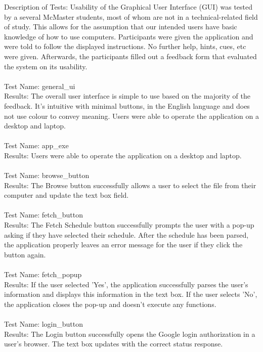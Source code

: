 \documentclass[12pt, titlepage]{article}
\begin{document}
	Description of Tests: Usability of the Graphical User Interface (GUI) was tested by a several McMaster students, most of whom are not in a technical-related field of study. This allows for the assumption that our intended users have basic knowledge of how to use computers. Participants were given the application and were told to follow the displayed instructions. No further help, hints, cues, etc were given. Afterwards, the participants filled out a feedback form that evaluated the system on its usability.\\
	\\
\newpage	 %
	Test Name: general\_ui\\
	Results: The overall user interface is simple to use based on the majority of the feedback. It's intuitive with minimal buttons, in the English language and does not use colour to convey meaning. Users were able to operate the application on a desktop and laptop.\\
	\\
	Test Name: app\_exe\\
	Results: Users were able to operate the application on a desktop and laptop.\\
	\\	
	Test Name: browse\_button\\
	Results: The Browse button successfully allows a user to select the file from their computer and update the text box field.\\
	\\	
	Test Name: fetch\_button\\
	Results: The Fetch Schedule button successfully prompts the user with a pop-up asking if they have selected their schedule. After the schedule has been parsed, the application properly leaves an error message for the user if they click the button again. \\
	\\
	Test Name: fetch\_popup\\
	Results: If the user selected 'Yes', the application successfully parses the user's information and displays this information in the text box. If the user selects 'No', the application closes the pop-up and doesn't execute any functions.\\
	\\		
	Test Name: login\_button\\
	Results: The Login button successfully opens the Google login authorization in a user's browser. The text box updates with the correct status response. \\
\end{document}
